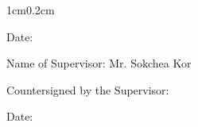 \begin{adjustwidth}{1cm}{0.2cm}
    \vspace{-0.1cm}
    \setlength{\parindent}{0pt}
    {\large Date: \dotfill\par}

    \vspace{0.5cm}
    \setlength{\parindent}{0pt}
    {\large Name of Supervisor: Mr. Sokchea Kor\par}
    
    \vspace{-0.1cm}
    \setlength{\parindent}{0pt}
    {\large Countersigned by the Supervisor: \dotfill\par}
    
    \vspace{-0.1cm}
    \setlength{\parindent}{0pt}
    {\large Date: \dotfill\par}

    
\end{adjustwidth}